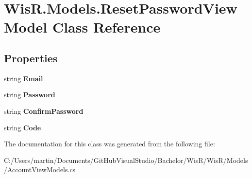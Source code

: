 \hypertarget{class_wis_r_1_1_models_1_1_reset_password_view_model}{}\section{Wis\+R.\+Models.\+Reset\+Password\+View\+Model Class Reference}
\label{class_wis_r_1_1_models_1_1_reset_password_view_model}
\subsection*{Properties}
\begin{DoxyCompactItemize}
\item 
\hypertarget{class_wis_r_1_1_models_1_1_reset_password_view_model_a18bb52d1175e36d0ddf48a27dfacdd93}{}string {\bfseries Email}\label{class_wis_r_1_1_models_1_1_reset_password_view_model_a18bb52d1175e36d0ddf48a27dfacdd93}

\item 
\hypertarget{class_wis_r_1_1_models_1_1_reset_password_view_model_a3414cb9463aec9881c0370942de6c92a}{}string {\bfseries Password}\label{class_wis_r_1_1_models_1_1_reset_password_view_model_a3414cb9463aec9881c0370942de6c92a}

\item 
\hypertarget{class_wis_r_1_1_models_1_1_reset_password_view_model_a13b4a5cd0b7e3bf335e5d1fa5ad912ab}{}string {\bfseries Confirm\+Password}\label{class_wis_r_1_1_models_1_1_reset_password_view_model_a13b4a5cd0b7e3bf335e5d1fa5ad912ab}

\item 
\hypertarget{class_wis_r_1_1_models_1_1_reset_password_view_model_a606125bd92b60f74a3507534712e8d1c}{}string {\bfseries Code}\label{class_wis_r_1_1_models_1_1_reset_password_view_model_a606125bd92b60f74a3507534712e8d1c}

\end{DoxyCompactItemize}


The documentation for this class was generated from the following file\+:\begin{DoxyCompactItemize}
\item 
C\+:/\+Users/martin/\+Documents/\+Git\+Hub\+Visual\+Studio/\+Bachelor/\+Wis\+R/\+Wis\+R/\+Models/Account\+View\+Models.\+cs\end{DoxyCompactItemize}
